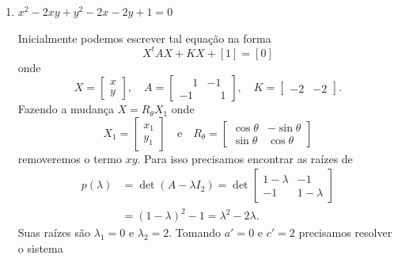 \begin{exemplos}
\begin{enumerate}
        \item $x^2 - 2xy + y^2 - 2x - 2y + 1 = 0$
              \begin{solucao}
                  Inicialmente podemos escrever tal equação na forma
                  \[
                      X^t A X + KX + [1] = [0]
                  \]
                  onde
                  \[
                      X = \begin{bmatrix}
                          x \\y
                      \end{bmatrix}, \quad A = \begin{bmatrix}
                          \phantom{-}1 & -1           \\
                          -1           & \phantom{-}1
                      \end{bmatrix},\quad K = \begin{bmatrix}
                          -2 & -2
                      \end{bmatrix}.
                  \]
                  Fazendo a mudança $X = R_\theta X_1$ onde
                  \[
                      X_1 = \begin{bmatrix}
                          x_1 \\y_1
                      \end{bmatrix} \quad\mbox{e}\quad R_\theta = \begin{bmatrix}
                          \cos\theta & -\sin\theta \\
                          \sin\theta & \cos\theta
                      \end{bmatrix}
                  \]
                  removeremos o termo $xy$. Para isso precisamos encontrar as raízes de
                  \begin{align*}
                      p(\lambda) & = \det (A - \lambda I_2) = \det \begin{bmatrix}
                                                                       1 - \lambda & -1          \\
                                                                       -1          & 1 - \lambda
                                                                   \end{bmatrix} \\ &= (1 - \lambda)^2 - 1 = \lambda^2 - 2\lambda.
                  \end{align*}
                  Suas raízes são $\lambda_1 = 0$ e $\lambda_2 = 2$. Tomando $a' = 0$ e $c' = 2$ precisamos resolver o sistema

\end{solucao}
\end{enumerate}
\end{exemplos}
